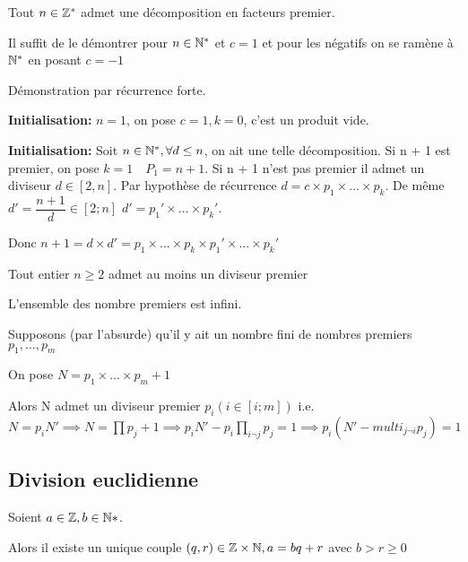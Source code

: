 \documentclass[a4paper, 12pt]{article}
\begin{document}
\begin{proposition}
    Tout $n \in \mathbb{Z}^*$ admet une décomposition en facteurs premier.
\end{proposition}

\begin{demonstration}
    Il suffit de le démontrer pour $n \in \mathbb{N}^*$ et $c = 1$ et pour les négatifs on se ramène à $\mathbb{N}^*$ en posant $c = -1$

    Démonstration par récurrence forte.

    \textbf{Initialisation:} $n = 1$, on pose $c = 1, k = 0$, c'est un produit vide.

    \textbf{Initialisation:} Soit $n \in \mathbb{N}^*, \forall d \leq n$, on ait une telle décomposition.
    Si n + 1 est premier, on pose $k = 1 \quad P_1 = n + 1$.
    Si n + 1 n'est pas premier il admet un diviseur $d \in [2, n]$.
    Par hypothèse de récurrence $d = c \times p_1 \times ... \times p_k$.
    De même $d' = \dfrac{n+1}{d} \in [2; n]$
    $d' = p_1' \times ... \times p_k'$.

    Donc $n + 1 = d \times d' = p_1 \times ... \times p_k \times p_1' \times ... \times p_k'$
\end{demonstration}

\begin{corollaire}
    Tout entier $n \geq 2$ admet au moins un diviseur premier
\end{corollaire}

\begin{proposition}
    L'ensemble des nombre premiers est infini.
\end{proposition}

\begin{demonstration}
    Supposons (par l'absurde) qu'il y ait un nombre fini de nombres premiers $p_1, ..., p_m$

    On pose $N = p_1 \times ... \times p_m + 1$

    Alors N admet un diviseur premier $p_i (i \in [i; m])$
    i.e. $N = p_i N' \implies N = \prod p_j + 1 \implies p_i N' - p_i \prod_{i \neg j} p_j = 1 \implies p_i (N' - multi_{j \neg i} p_j) = 1$
\end{demonstration}

\subsection{Division euclidienne}

\begin{theorem}
    Soient $a \in \mathbb{Z}, b \in \mathbb{N}*$.
    
    Alors il existe un unique couple $(q, r) \in \mathbb{Z} \times \mathbb{N}, a = bq + r$ avec $b \gt r \geq 0$
\end{theorem}
\end{document}
